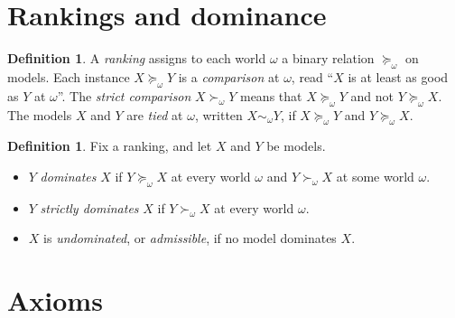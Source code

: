 \documentclass[11pt]{article}
\theoremstyle{plain}
\theoremstyle{definition}
\newtheorem{definition}[theorem]{Definition}
\theoremstyle{remark}
\begin{document}
\section{Rankings and dominance}\label{sec:rankings}

\begin{definition}\label{def:ranking}
A \emph{ranking} assigns to each world $\omega$ a binary relation $\succeq_\omega$ on models.
Each instance $X\succeq_\omega Y$ is a \emph{comparison} at $\omega$, read ``$X$ is at least as
good as $Y$ at $\omega$''. The \emph{strict comparison} $X\succ_\omega Y$ means that
$X\succeq_\omega Y$ and not $Y\succeq_\omega X$. The models $X$ and $Y$ are \emph{tied} at
$\omega$, written $X\sim_\omega Y$, if $X\succeq_\omega Y$ and $Y\succeq_\omega X$.
\end{definition}

\begin{definition}\label{def:dominance}
Fix a ranking, and let $X$ and $Y$ be models.
\begin{itemize}
  \item $Y$ \emph{dominates} $X$ if $Y\succeq_\omega X$ at every world $\omega$ and
  $Y\succ_\omega X$ at some world $\omega$.
  \item $Y$ \emph{strictly dominates} $X$ if $Y\succ_\omega X$ at every world $\omega$.
  \item $X$ is \emph{undominated}, or \emph{admissible}, if no model dominates $X$.
\end{itemize}
\end{definition}

\section{Axioms}\label{sec:axioms}
\end{document}
